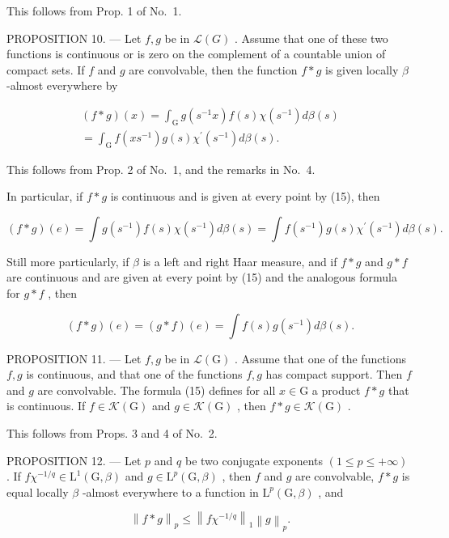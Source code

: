 This follows from Prop. 1 of No.~1.

PROPOSITION 10. --- Let \(f, g\) be in \(\mathcal{L}(G)\) . Assume that one of these two functions is continuous or is zero on the complement of a countable union of compact sets. If \(f\) and \(g\) are convolvable, then the function \(f * g\) is given locally \(\beta\) -almost everywhere by

\[
\begin{array}{c} (f * g) (x) = \int_ {\mathrm{G}} g (s ^ {- 1} x) f (s) \chi (s ^ {- 1}) d \beta (s) \\ = \int_ {\mathrm{G}} f (x s ^ {- 1}) g (s) \chi^ {\prime} (s ^ {- 1}) d \beta (s). \end{array}\tag{15}
\]

This follows from Prop. 2 of No.~1, and the remarks in No.~4.

In particular, if \(f * g\) is continuous and is given at every point by (15), then

\[
(f * g) (e) = \int g (s ^ {- 1}) f (s) \chi (s ^ {- 1}) d \beta (s) = \int f (s ^ {- 1}) g (s) \chi^ {\prime} (s ^ {- 1}) d \beta (s).\tag{16}
\]

Still more particularly, if \(\beta\) is a left and right Haar measure, and if \(f*g\) and \(g*f\) are continuous and are given at every point by (15) and the analogous formula for \(g*f\) , then

\[
(f * g) (e) = (g * f) (e) = \int f (s) g (s ^ {- 1}) d \beta (s).\tag{17}
\]

PROPOSITION 11. --- Let \(f,g\) be in \(\mathcal{L}(\mathrm{G})\) . Assume that one of the functions \(f,g\) is continuous, and that one of the functions \(f,g\) has compact support. Then \(f\) and \(g\) are convolvable. The formula (15) defines for all \(x\in\mathrm{G}\) a product \(f*g\) that is continuous. If \(f\in\mathcal{K}(\mathrm{G})\) and \(g\in\mathcal{K}(\mathrm{G})\) , then \(f*g\in\mathcal{K}(\mathrm{G})\) .

This follows from Props. 3 and 4 of No.~2.

PROPOSITION 12. --- Let \(p\) and \(q\) be two conjugate exponents \((1 \leqslant p \leqslant +\infty)\) . If \(f\chi^{-1/q} \in \mathrm{L}^1(\mathrm{G}, \beta)\) and \(g \in \mathrm{L}^p(\mathrm{G}, \beta)\) , then \(f\) and \(g\) are convolvable, \(f * g\) is equal locally \(\beta\) -almost everywhere to a function in \(\mathrm{L}^p(\mathrm{G}, \beta)\) , and

\[
\left\| f * g \right\| _ {p} \leqslant \left\| f \chi^ {- 1 / q} \right\| _ {1} \left\| g \right\| _ {p}.
\]

